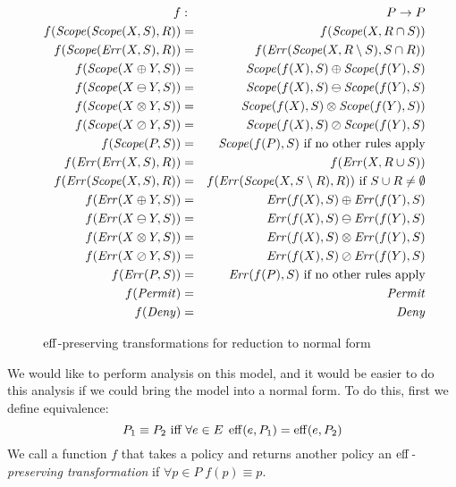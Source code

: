 \begin{figure}[t]
\centering
\begin{footnotesize}
\begin{eqnarray*}
  f & : & P   \rightarrow  P \nonumber \\
  f (\text{\textit{Scope}} (\text{\textit{Scope}} (X, S), R))  & = & f (\text{\textit{Scope}} (X, R \cap S)) 
  \nonumber \\
  f (\text{\textit{Scope}} (\text{\textit{Err}} (X, S), R)) & = & f (\text{\textit{Err}} (\text{\textit{Scope}} (X, R \setminus S), S \cap R)) 
  \nonumber \\
  f (\text{\textit{Scope}} (X \oplus Y, S)) & = & \text{\textit{Scope}} (f (X), S) \oplus \text{\textit{Scope}} (f (Y), S) 
  \nonumber \\
  f (\text{\textit{Scope}} (X \ominus Y, S)) & = & \text{\textit{Scope}} (f (X), S) \ominus \text{\textit{Scope}} (f (Y), S) 
  \nonumber \\
  f (\text{\textit{Scope}} (X \otimes Y, S)) & = & \text{\textit{Scope}} (f (X), S) \otimes \text{\textit{Scope}} (f (Y), S)) 
  \nonumber \\
  f (\text{\textit{Scope}} (X \oslash Y, S)) & = & \text{\textit{Scope}} (f (X), S) \oslash \text{\textit{Scope}} (f (Y), S) 
  \nonumber \\
  f (\text{\textit{Scope}} (P, S)) & = & \text{\textit{Scope}} (f (P), S) 
     \ \text{if no other rules apply} \nonumber \\
  f (\text{\textit{Err}} (\text{\textit{Err}} (X, S), R)) & = & f (\text{\textit{Err}} (X, R \cup S)) \nonumber \\
  f (\text{\textit{Err}} (\text{\textit{Scope}} (X, S), R)) & = & f (\text{\textit{Err}} (\text{\textit{Scope}} (X, S \setminus R), R)) 
     \ \text{if $S \cup R \neq \emptyset$} \nonumber \\
  f (\text{\textit{Err}} (X \oplus Y, S))  & = &  \text{\textit{Err}} (f (X), S) \oplus \text{\textit{Err}} (f (Y), S) \nonumber \\
  f (\text{\textit{Err}} (X \ominus Y, S)) & = &  \text{\textit{Err}} (f (X), S) \ominus \text{\textit{Err}} (f (Y), S) \nonumber \\
  f (\text{\textit{Err}} (X \otimes Y, S)) & = &  \text{\textit{Err}} (f (X), S) \otimes \text{\textit{Err}} (f (Y), S) \nonumber \\
  f (\text{\textit{Err}} (X \oslash Y, S)) & = &  \text{\textit{Err}} (f (X), S) \oslash \text{\textit{Err}} (f (Y), S) \nonumber \\
  f (\text{\textit{Err}} (P, S)) & = & \text{\textit{Err}} (f (P), S) 
     \  \text{if no other rules apply} \nonumber \\
  f (\text{\textit{Permit}}) & = & \text{\textit{Permit}} \nonumber \\
  f (\text{\textit{Deny}}) & = & \text{\textit{Deny}} \nonumber
\end{eqnarray*}
\end{footnotesize}
\caption{$\operatorname{eff}$-preserving transformations for reduction to normal form}
\label{fig:1streduction}
\end{figure}

We would like to perform analysis on this model, and it would be
easier to do this analysis if we could bring the model into a normal
form.  To do this, first we define equivalence:
\begin{equation*}
  P_1 \equiv P_2 \text{ iff } \forall e \in E \; \operatorname{eff} (e, P_1) = \operatorname{eff} (e, P_2)
\end{equation*}
We call a function $f$ that takes a policy and returns another
policy an \emph{$\operatorname{eff}$-preserving transformation} if $\forall p \in P
\; f (p) \equiv p$.

